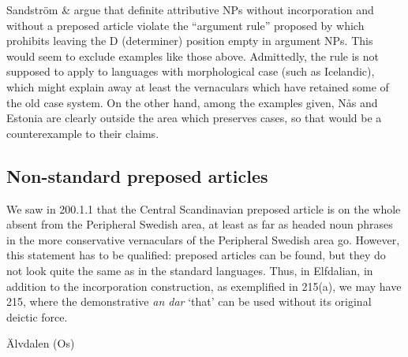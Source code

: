 \begin{styleBodyTextFirst}
Sandström \& \citet[110]{Holmberg2003} argue that definite attributive NPs without incorporation and without a preposed article violate the “argument rule” proposed by \citet{Delsing1993} which prohibits leaving the D (determiner) position empty in argument NPs. This would seem to exclude examples like those above. Admittedly, the rule is not supposed to apply to languages with morphological case (such as Icelandic), which might explain away at least the vernaculars which have retained some of the old case system. On the other hand, among the examples given, Nås and Estonia are clearly outside the area which preserves cases, so that would be a counterexample to their claims. 

\end{styleBodyTextFirst}

\subsection{Non-standard preposed articles }
\label{bkm:Ref264372909}\label{bkm:Ref264372864}\label{bkm:Ref264372580}
\begin{styleBodyTextFirst}
We saw in 200.1.1 that the Central Scandinavian preposed article is on the whole absent from the Peripheral Swedish area, at least as far as headed noun phrases in the more conservative vernaculars of the Peripheral Swedish area go. However, this statement has to be qualified: preposed articles can be found, but they do not look quite the same as in the standard languages. Thus, in Elfdalian, in addition to the incorporation construction, as exemplified in 215(a), we may have 215, where the demonstrative \textit{an dar} ‘that’ can be used without its original deictic force.

\end{styleBodyTextFirst}

\begin{listWWNumileveli}
\item {}

\begin{styleExample}
\label{bkm:Ref155154659}Älvdalen (Os)

\end{styleExample}

\end{listWWNumileveli}

\begin{listWWNumlxiiileveli}
\item {}

\end{listWWNumlxiiileveli}

